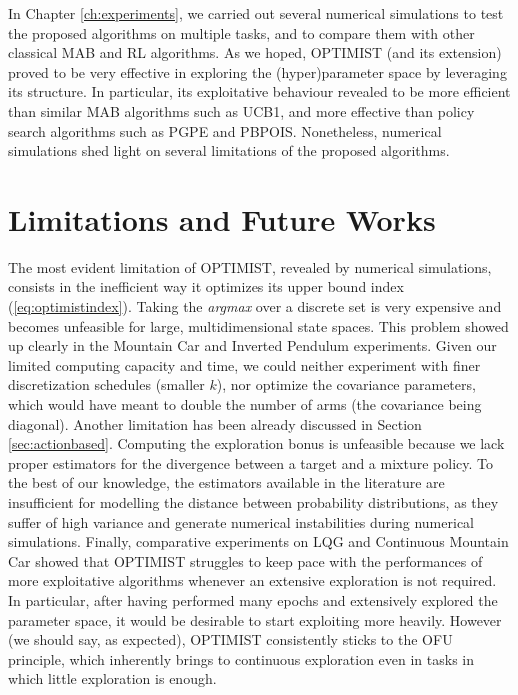 In Chapter \ref{ch:experiments}, we carried out several numerical simulations to test the proposed algorithms on multiple tasks, and to compare them with other classical \gls{MAB} and \gls{RL} algorithms. As we hoped, \gls{OPTIMIST} (and its extension) proved to be very effective in exploring the (hyper)parameter space by leveraging its structure. In particular, its exploitative behaviour revealed to be more efficient than similar \gls{MAB} algorithms such as \gls{UCB}1, and more effective than policy search algorithms such as \gls{PGPE} and \gls{PBPOIS}. Nonetheless, numerical simulations shed light on several limitations of the proposed algorithms.

\section{Limitations and Future Works}
The most evident limitation of \gls{OPTIMIST}, revealed by numerical simulations, consists in the inefficient way it optimizes its upper bound index (\ref{eq:optimistindex}). Taking the \emph{argmax} over a discrete set is very expensive and becomes unfeasible for large, multidimensional state spaces. This problem showed up clearly in the Mountain Car and Inverted Pendulum experiments. Given our limited computing capacity and time, we could neither experiment with finer discretization schedules (smaller $k$), nor optimize the covariance parameters, which would have meant to double the number of arms (the covariance being diagonal). 
Another limitation has been already discussed in Section \ref{sec:actionbased}. Computing the exploration bonus is unfeasible because we lack proper estimators for the \Renyi divergence between a target and a mixture policy. To the best of our knowledge, the estimators available in the literature are insufficient for modelling the \Renyi distance between probability distributions, as they suffer of high variance and generate numerical instabilities during numerical simulations. 
Finally, comparative experiments on \gls{LQG} and  Continuous Mountain Car showed that \gls{OPTIMIST} struggles to keep pace with the performances of more exploitative algorithms whenever an extensive exploration is not required. In particular, after having performed many epochs and extensively explored the parameter space, it would be desirable to start exploiting more heavily. However (we should say, as expected), \gls{OPTIMIST} consistently sticks to the \gls{OFU} principle, which inherently brings to continuous exploration even in tasks in which little exploration is enough.

